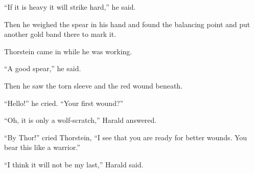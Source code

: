 ``If it is heavy it will strike hard,'' he said.

Then he weighed the spear in his hand and found the balancing point and
put another gold band there to mark it.

Thorstein came in while he was working.

``A good spear,'' he said.

Then he saw the torn sleeve and the red wound beneath.

``Hello!'' he cried. ``Your first wound?''

``Oh, it is only a wolf-scratch,'' Harald answered.

``By Thor!'' cried Thorstein, ``I see that you are ready for better
wounds. You bear this like a warrior.''

``I think it will not be my last,'' Harald said.
